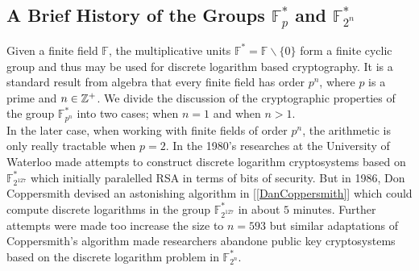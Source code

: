 





\subsection{A Brief History of the Groups $\mathbb{F}_p^*$ and $\mathbb{F}_{2^n}^*$}

Given a finite field $\mathbb{F}$, the multiplicative units $\mathbb{F}^* = \mathbb{F} \backslash \lbrace 0 \rbrace $ form a finite cyclic group and thus may be used for discrete logarithm based cryptography. It is a standard result from algebra that every finite field has order $p^n$, where $p$ is a prime and $n \in \mathbb{Z}^+$. We divide the discussion of the cryptographic properties of the group $\mathbb{F}_{p^n}^*$ into two cases; when $n = 1$ and when $n>1$. \\

In the later case, when working with finite fields of order $p^n$, the arithmetic is only really tractable when $p=2$. In the 1980's researches at the University of Waterloo made attempts to construct discrete logarithm cryptosystems based on $\mathbb{F}_{2^{127}}^*$ which initially paralelled RSA in terms of bits of security. But in 1986, Don Coppersmith devised an astonishing algorithm in [\ref{DanCoppersmith}] which could compute discrete logarithms in the group $\mathbb{F}_{2^{127}}^*$ in about $5$ minutes. Further attempts were made too increase the size to $n=593$ but similar adaptations of Coppersmith's algorithm made researchers abandone public key cryptosystems based on the discrete logarithm problem in $\mathbb{F}_{2^n}^*$. \\

